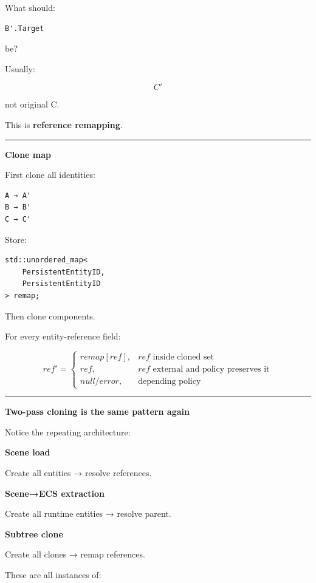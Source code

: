 What should:

\begin{verbatim}
B'.Target
\end{verbatim}

be?

Usually:

\[
C'
\]

not original C.

This is \textbf{reference remapping}.

\begin{center}\rule{0.5\linewidth}{0.5pt}\end{center}

\textbf{Clone map}

First clone all identities:

\begin{verbatim}
A → A'
B → B'
C → C'
\end{verbatim}

Store:

\begin{verbatim}
std::unordered_map<
    PersistentEntityID,
    PersistentEntityID
> remap;
\end{verbatim}

Then clone components.

For every entity-reference field:

\[
ref'=
\begin{cases}
remap[ref],&ref\text{ inside cloned set}\\
ref,&ref\text{ external and policy preserves it}\\
null/error,&\text{depending policy}
\end{cases}
\]

\begin{center}\rule{0.5\linewidth}{0.5pt}\end{center}

\textbf{Two-pass cloning is the same pattern again}

Notice the repeating architecture:

\textbf{Scene load}

Create all entities → resolve references.

\textbf{Scene→ECS extraction}

Create all runtime entities → resolve parent.

\textbf{Subtree clone}

Create all clones → remap references.

These are all instances of:

